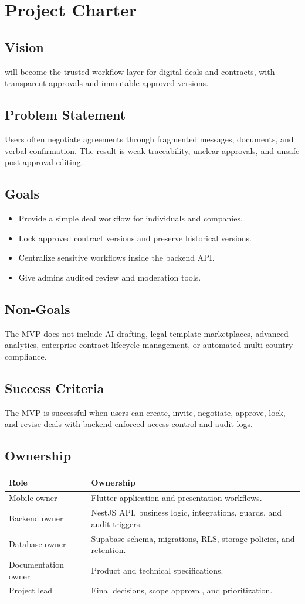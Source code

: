 \chapter{Project Charter}
\section{Vision}
\projectname{} will become the trusted workflow layer for digital deals and contracts, with transparent approvals and immutable approved versions.
\section{Problem Statement}
Users often negotiate agreements through fragmented messages, documents, and verbal confirmation. The result is weak traceability, unclear approvals, and unsafe post-approval editing.
\section{Goals}
\begin{itemize}
  \item Provide a simple deal workflow for individuals and companies.
  \item Lock approved contract versions and preserve historical versions.
  \item Centralize sensitive workflows inside the backend API.
  \item Give admins audited review and moderation tools.
\end{itemize}
\section{Non-Goals}
The MVP does not include AI drafting, legal template marketplaces, advanced analytics, enterprise contract lifecycle management, or automated multi-country compliance.
\section{Success Criteria}
The MVP is successful when users can create, invite, negotiate, approve, lock, and revise deals with backend-enforced access control and audit logs.
\section{Ownership}
\begin{longtable}{p{}p{}}
\toprule
Role & Ownership \\
\midrule
Mobile owner & Flutter application and presentation workflows. \\
Backend owner & NestJS API, business logic, integrations, guards, and audit triggers. \\
Database owner & Supabase schema, migrations, RLS, storage policies, and retention. \\
Documentation owner & Product and technical specifications. \\
Project lead & Final decisions, scope approval, and prioritization. \\
\bottomrule
\end{longtable}
